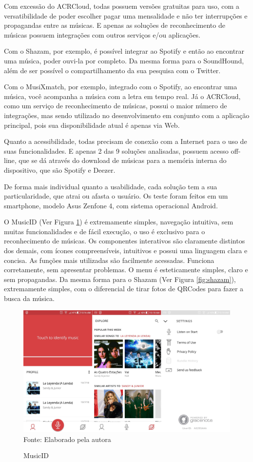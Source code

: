 Com excessão do ACRCloud, todas possuem versões gratuitas para uso, com a versatibilidade de poder escolher pagar uma mensalidade e não ter interrupções e propagandas entre as músicas. E apenas as soluções de reconhecimento de músicas possuem integrações com outros serviços e/ou aplicações.

Com o Shazam, por exemplo, é possível integrar ao Spotify e então ao encontrar uma música, poder ouvi-la por completo. Da mesma forma para o SoundHound, além de ser possível o compartilhamento da sua pesquisa com o Twitter. 

Com o MusiXmatch, por exemplo, integrado com o Spotify, ao encontrar uma música, você acompanha a música com a letra em tempo real. Já o ACRCloud, como um serviço de reconhecimento de músicas, possui o maior número de integrações, mas sendo utilizado no desenvolvimento em conjunto com a aplicação principal, pois sua disponibilidade atual é apenas via Web.

Quanto a acessibilidade, todas precisam de conexão com a Internet para o uso de suas funcionalidades. E apenas 2 das 9 soluções analisadas, possuem acesso off-line, que se dá através do download de músicas para a memória interna do dispositivo, que são Spotify e Deezer.

De forma mais individual quanto a usabilidade, cada solução tem a sua particularidade, que atrai ou afasta o usuário. Os teste foram feitos em um smartphone, modelo Asus Zenfone 4, com sistema operacional Android.

O MusicID (Ver Figura \ref{fig:musicID}) é extremamente simples, navegação intuitiva, sem muitas funcionalidades e de fácil execução, o uso é exclusivo para o reconhecimento de músicas. Os componentes interativos são claramente distintos dos demais, com ícones compreensíveis, intuitivos e possui uma linguagem clara e concisa. As funções mais utilizadas são facilmente acessadas. Funciona corretamente, sem apresentar problemas. O menu é esteticamente simples, claro e sem propagandas. Da mesma forma para o Shazam (Ver Figura \ref{fig:shazam}), extremamente simples, com o diferencial de tirar fotos de QRCodes para fazer a busca da música.

\begin{figure}[!htb]
   \centering
   \caption{MusicID}\label{fig:musicID} 
   \includegraphics[scale=0.17]{figuras/MusicID.jpg}
   \\Fonte: Elaborado pela autora
\end{figure}

